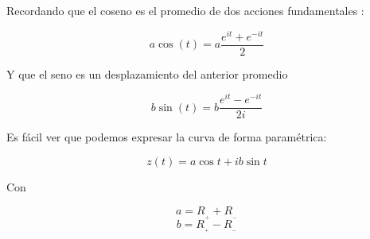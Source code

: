 \documentclass[preview]{standalone}
\begin{document}
\begin{center}
Recordando que el coseno es el promedio de dos acciones fundamentales :

$$a \cos(t)=a\frac{e^{it}+e^{-it}}{2}$$


Y que el seno es un desplazamiento del anterior promedio 

$$b \sin(t)=b\frac{e^{it}-e^{-it}}{2i}$$


Es fácil ver que podemos expresar la curva  de forma paramétrica:

$$z(t)=a\cos{t}+i b \sin{t}$$ 

Con 

$$a=R_{_+}+R_{_-}$$ 
$$b=R_{_+}-R_{_-}$$
\end{center}
\end{document}
